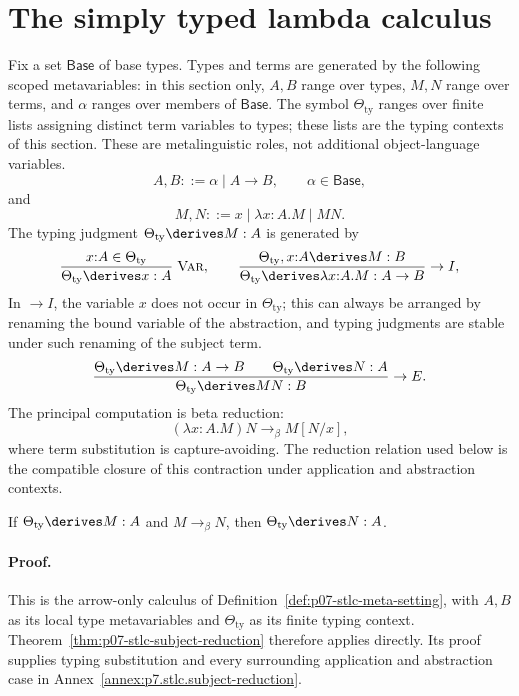 \section{The simply typed lambda calculus}
\label{sec:normalization-curry-howard-02}

Fix a set \(\mathsf{Base}\) of base types.  Types and terms are generated by
the following scoped metavariables: in this section only, \(A,B\) range over
types, \(M,N\) range over terms, and \(\alpha\) ranges over members of
\(\mathsf{Base}\).  The symbol \(\Theta_{\mathrm{ty}}\) ranges over finite
lists assigning distinct term variables to types; these lists are the typing
contexts of this section.  These are metalinguistic roles, not additional
object-language variables.
\[
  A,B::=\alpha\mid A\to B,
  \qquad \alpha\in\mathsf{Base},
\]
and
\[
  M,N::=x\mid \lambda x{:}A.M\mid MN.
\]
The typing judgment \(\Theta_{\mathrm{ty}}\derives M:A\) is generated by
\[
\frac{x{:}A\in\Theta_{\mathrm{ty}}}
     {\Theta_{\mathrm{ty}}\derives x:A}\;\textsc{Var},
\qquad
\frac{\Theta_{\mathrm{ty}},x{:}A\derives M:B}
     {\Theta_{\mathrm{ty}}\derives\lambda x{:}A.M:A\to B}
     \;\textsc{\(\to I\)},
\]
In \textsc{\(\to I\)}, the variable \(x\) does not occur in
\(\Theta_{\mathrm{ty}}\); this can always be arranged by renaming the
bound variable of the abstraction, and typing judgments are stable under
such renaming of the subject term.
\[
\frac{\Theta_{\mathrm{ty}}\derives M:A\to B
      \qquad
      \Theta_{\mathrm{ty}}\derives N:A}
     {\Theta_{\mathrm{ty}}\derives MN:B}\;\textsc{\(\to E\)}.
\]
The principal computation is beta reduction:
\[
  (\lambda x{:}A.M)N\longrightarrow_\beta M[N/x],
\]
where term substitution is capture-avoiding.
The reduction relation used below is the compatible closure of this
contraction under application and abstraction contexts.

\begin{theorem}
If \(\Theta_{\mathrm{ty}}\derives M:A\) and
\(M\longrightarrow_\beta N\), then
\(\Theta_{\mathrm{ty}}\derives N:A\).
\end{theorem}

\paragraph{Proof.}
This is the arrow-only calculus of Definition~\ref{def:p07-stlc-meta-setting},
with \(A,B\) as its local type metavariables and \(\Theta_{\mathrm{ty}}\)
as its finite typing context. Theorem~\ref{thm:p07-stlc-subject-reduction}
therefore applies directly. Its proof supplies typing substitution and
every surrounding application and abstraction case in
Annex~\ref{annex:p7.stlc.subject-reduction}.

